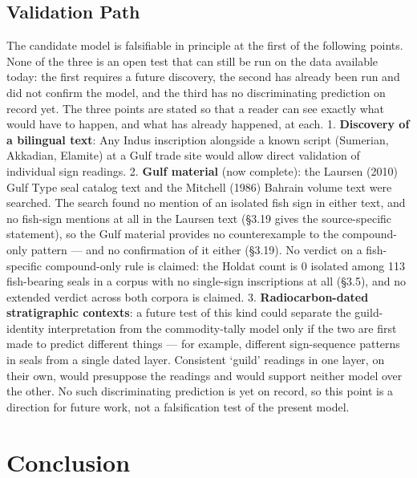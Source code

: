 \documentclass[11pt]{article}
\begin{document}
\subsection{Validation Path}\label{validation-path}

The candidate model is falsifiable in principle at the first of the following points. None of the three is an open test that can still be run on the data available today: the first requires a future discovery, the second has already been run and did not confirm the model, and the third has no discriminating prediction on record yet. The three points are stated so that a reader can see exactly what would have to happen, and what has already happened, at each. 1. \textbf{Discovery of
a bilingual text}: Any Indus inscription alongside a known script
(Sumerian, Akkadian, Elamite) at a Gulf trade site would allow direct
validation of individual sign readings. 2. \textbf{Gulf material} (now complete): the Laursen (2010) Gulf Type seal catalog text and the Mitchell (1986) Bahrain volume text were searched. The search found no mention of an isolated fish sign in either text, and no fish-sign mentions at all in the Laursen text (§3.19 gives the source-specific statement), so the Gulf material provides no counterexample to the compound-only pattern --- and no confirmation of it either (§3.19). No verdict on a fish-specific compound-only rule is claimed: the Holdat count is 0 isolated among 113 fish-bearing seals in a corpus with no single-sign inscriptions at all (§3.5), and no extended verdict across both corpora is claimed. 3.
\textbf{Radiocarbon-dated stratigraphic contexts}: a future test of this kind could separate the guild-identity interpretation from the commodity-tally model only if the two are first made to predict different things --- for example, different sign-sequence patterns in seals from a single dated layer. Consistent `guild' readings in one layer, on their own, would presuppose the readings and would support neither model over the other. No such discriminating prediction is yet on record, so this point is a direction for future work, not a falsification test of the present model.

\section{Conclusion}\label{conclusion}
\end{document}
